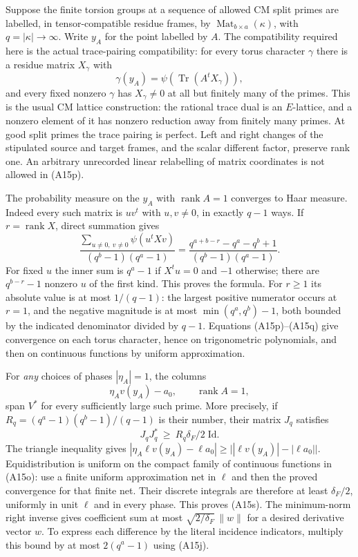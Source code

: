 Suppose the finite torsion groups at a sequence of allowed CM split
primes are labelled, in tensor-compatible residue frames, by
$\operatorname{Mat}_{b\times a}(\kappa)$, with $q=|\kappa|\to\infty$.
Write $y_A$ for the point labelled by $A$.  The compatibility required
here is the actual trace-pairing compatibility: for every torus
character $\gamma$ there is a residue matrix $X_\gamma$ with
\[
        \gamma(y_A)=\psi(\operatorname{Tr}(A^tX_\gamma)),
 \tag{A15p}
\]
and every fixed nonzero $\gamma$ has $X_\gamma\ne0$ at all but
finitely many of the primes.  This is the usual CM lattice
construction: the rational trace dual is an $E$-lattice, and a
nonzero element of it has nonzero reduction away from finitely many
primes.  At good split primes the trace pairing is perfect.
Left and right changes of the stipulated source and target frames,
and the scalar different factor, preserve rank one.  An arbitrary
unrecorded linear relabelling of matrix coordinates is not allowed
in (A15p).

The probability measure on the $y_A$ with $\operatorname{rank}A=1$
converges to Haar measure.  Indeed every such matrix is $uv^t$ with
$u,v\ne0$, in exactly $q-1$ ways.  If $r=\operatorname{rank}X$, direct
summation gives
\[
 \frac{\sum_{u\ne0,\ v\ne0}\psi(u^tXv)}
            {(q^b-1)(q^a-1)}
  =\frac{q^{a+b-r}-q^a-q^b+1}{(q^b-1)(q^a-1)}.
 \tag{A15q}
\]
For fixed $u$ the inner sum is $q^a-1$ if $X^tu=0$ and $-1$
otherwise; there are $q^{b-r}-1$ nonzero $u$ of the first kind.
This proves the formula.  For $r\ge1$ its absolute value is at
most $1/(q-1)$: the largest positive numerator occurs at $r=1$,
and the negative magnitude is at most
$\min(q^a,q^b)-1$, both bounded by the indicated denominator
divided by $q-1$.  Equations (A15p)--(A15q) give convergence on
each torus character, hence on trigonometric polynomials, and then
on continuous functions by uniform approximation.

For \emph{any} choices of phases $|\eta_A|=1$, the columns
\[
                 \eta_Av(y_A)-a_0,
                 \qquad \operatorname{rank}A=1,
 \tag{A15r}
\]
span $V^*$ for every sufficiently large such prime.  More precisely,
if $R_q=(q^a-1)(q^b-1)/(q-1)$ is their number, their matrix $J_q$
satisfies
\[
             J_qJ_q^*\ \ge\ R_q\delta_F/2\;\mathrm{Id}.
 \tag{A15s}
\]
The triangle inequality gives
$|\eta_A\ell v(y_A)-\ell a_0|
 \ge\bigl||\ell v(y_A)|-|\ell a_0|\bigr|$.
Equidistribution is uniform on the compact family of continuous
functions in (A15o): use a finite uniform approximation net in
$\ell$ and then the proved convergence for that finite net.
Their discrete integrals are therefore at least $\delta_F/2$,
uniformly in unit $\ell$ and in every phase.  This proves (A15s).
The minimum-norm right inverse gives coefficient sum at most
$\sqrt{2/\delta_F}\,\|w\|$ for a desired derivative vector $w$.
To express each difference by the literal incidence indicators,
multiply this bound by at most $2(q^a-1)$ using (A15j).

